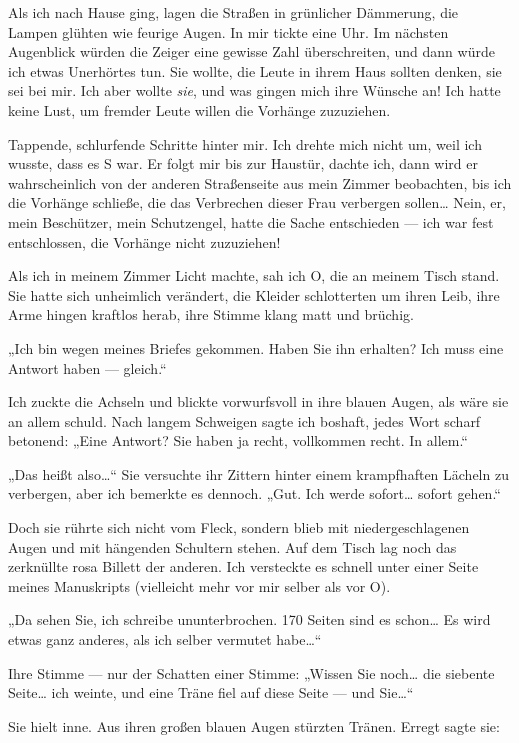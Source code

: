 Als ich nach Hause ging, lagen die Straßen in grünlicher Dämmerung,
die Lampen glühten wie feurige Augen. In mir tickte eine Uhr. Im
nächsten Augenblick würden die Zeiger eine gewisse Zahl
überschreiten, und dann würde ich etwas Unerhörtes tun. Sie wollte,
die Leute in ihrem Haus sollten denken, sie sei bei mir. Ich aber
wollte \emph{sie}, und was gingen mich ihre Wünsche an! Ich hatte keine
Lust, um fremder Leute willen die Vorhänge zuzuziehen.

Tappende, schlurfende Schritte hinter mir. Ich drehte mich nicht
um, weil ich wusste, dass es S war. Er folgt mir bis zur Haustür,
dachte ich, dann wird er wahrscheinlich von der anderen
Straßenseite aus mein Zimmer beobachten, bis ich die Vorhänge
schließe, die das Verbrechen dieser Frau verbergen sollen\ldots{} Nein,
er, mein Beschützer, mein Schutzengel, hatte die Sache entschieden
— ich war fest entschlossen, die Vorhänge nicht zuzuziehen!

Als ich
in meinem Zimmer Licht machte, sah ich O, die an meinem Tisch
stand. Sie hatte sich unheimlich verändert, die Kleider schlotterten
um ihren Leib, ihre Arme hingen
kraftlos herab, ihre Stimme klang matt und brüchig.

„Ich bin wegen meines Briefes gekommen. Haben Sie ihn erhalten? Ich
muss eine Antwort haben — gleich.“

Ich zuckte die Achseln und
blickte vorwurfsvoll in ihre blauen Augen, als wäre sie an allem
schuld. Nach langem Schweigen sagte ich boshaft, jedes Wort scharf
betonend: „Eine Antwort? Sie haben ja recht, vollkommen recht. In
allem.“

„Das heißt also\ldots{}“ Sie versuchte ihr Zittern hinter einem
krampfhaften Lächeln zu verbergen, aber ich bemerkte es dennoch.
„Gut. Ich werde sofort\ldots{} sofort gehen.“

Doch sie rührte sich nicht vom Fleck, sondern blieb mit
niedergeschlagenen Augen und mit hängenden Schultern stehen. Auf
dem Tisch lag noch das zerknüllte rosa Billett der anderen. Ich
versteckte es schnell unter einer Seite meines Manuskripts
(vielleicht mehr vor mir selber als vor O).

„Da sehen Sie, ich schreibe ununterbrochen. 170 Seiten sind es
schon\ldots{} Es wird etwas ganz anderes, als ich selber vermutet
habe\ldots{}“

Ihre Stimme — nur der Schatten einer Stimme: „Wissen Sie
noch\ldots{} die siebente Seite\ldots{} ich weinte, und eine Träne fiel auf
diese Seite — und Sie\ldots{}“

Sie hielt inne. Aus ihren großen blauen Augen stürzten Tränen. Erregt sagte sie:


